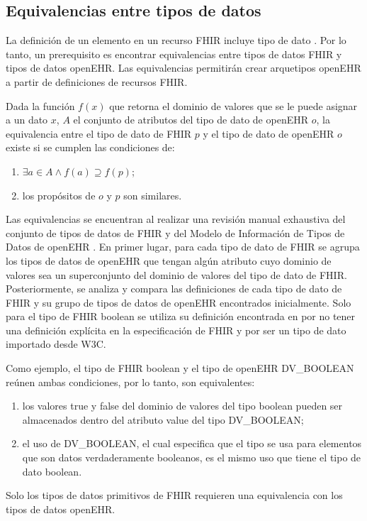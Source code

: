 \subsection{Equivalencias entre tipos de datos}

La definición de un elemento en un recurso FHIR incluye tipo de dato \cite{FHIRElement}. Por lo tanto, un prerequisito es encontrar equivalencias entre tipos de datos FHIR y tipos de datos openEHR. Las equivalencias permitirán crear arquetipos openEHR a partir de definiciones de recursos FHIR.

Dada la función \( f(x) \) que retorna el dominio de valores que se le puede asignar a un dato \( x \), \( A \) el conjunto de atributos del tipo de dato de openEHR \( o \), la equivalencia entre el tipo de dato de FHIR \( p \)  y el tipo de dato de openEHR \( o \) existe si se cumplen las condiciones de:

\begin{enumerate}
  \item \( \exists a \in A \land f(a) \supseteq f(p) \);
  \item los propósitos de \( o \) y \( p \) son similares.
\end{enumerate}

Las equivalencias se encuentran al realizar una revisión manual exhaustiva del conjunto de tipos de datos de FHIR \cite{FHIRDataTypes} y del Modelo de Información de Tipos de Datos de openEHR \cite{openEHRDataTypes}. En primer lugar, para cada tipo de dato de FHIR se agrupa los tipos de datos de openEHR que tengan algún atributo cuyo dominio de valores sea un superconjunto del dominio de valores del tipo de dato de FHIR. Posteriormente, se analiza y compara las definiciones de cada tipo de dato de FHIR y su grupo de tipos de datos de openEHR encontrados inicialmente. Solo para el tipo de FHIR boolean se utiliza su definición encontrada en \cite{W3C} por no tener una definición explícita en la especificación de FHIR y por ser un tipo de dato importado desde W3C.

Como ejemplo, el tipo de FHIR boolean y el tipo de openEHR DV\_BOOLEAN reúnen ambas condiciones, por lo tanto, son equivalentes:
\begin{enumerate}
  \item los valores true y false del dominio de valores del tipo boolean pueden ser almacenados dentro del atributo value del tipo DV\_BOOLEAN;
  \item el uso de DV\_BOOLEAN, el cual especifica que el tipo se usa para elementos que son datos verdaderamente booleanos, es el mismo uso que tiene el tipo de dato boolean.
\end{enumerate}

Solo los tipos de datos primitivos de FHIR requieren una equivalencia con los tipos de datos openEHR.

